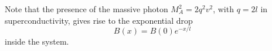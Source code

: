 \documentclass[../main/main.tex]{subfiles}
\begin{document}
\begin{figure}[h!]
\begin{minipage}[c]{0.5\linewidth}
\end{minipage}
\begin{minipage}[]{0.5\linewidth}
\centering
{}
\end{minipage}
\caption{\label{fig:} }
\end{figure}


\begin{remark}
Note that the  presence of the massive photon \( M^2_A = 2 q^2 v^2 \), with \( q = 2 l \) in superconductivity, gives rise to the exponential drop
\begin{equation*}
  B (x) = B(0) e^ {- x/l}
\end{equation*}
inside the system.
\end{remark}
\end{document}
